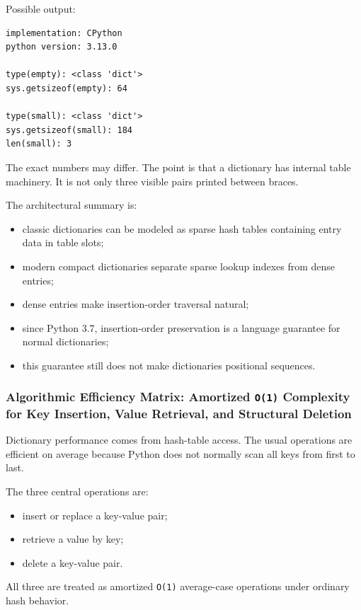 Possible output:

\begin{verbatim}
implementation: CPython
python version: 3.13.0

type(empty): <class 'dict'>
sys.getsizeof(empty): 64

type(small): <class 'dict'>
sys.getsizeof(small): 184
len(small): 3
\end{verbatim}

The exact numbers may differ. The point is that a dictionary has internal table machinery. It is not only three visible pairs printed between braces.

The architectural summary is:

\begin{itemize}
    \item classic dictionaries can be modeled as sparse hash tables containing entry data in table slots;
    \item modern compact dictionaries separate sparse lookup indexes from dense entries;
    \item dense entries make insertion-order traversal natural;
    \item since Python 3.7, insertion-order preservation is a language guarantee for normal dictionaries;
    \item this guarantee still does not make dictionaries positional sequences.
\end{itemize}

\subsubsection{Algorithmic Efficiency Matrix: Amortized \texttt{O(1)} Complexity for Key Insertion, Value Retrieval, and Structural Deletion}

Dictionary performance comes from hash-table access. The usual operations are efficient on average because Python does not normally scan all keys from first to last.

The three central operations are:

\begin{itemize}
    \item insert or replace a key-value pair;
    \item retrieve a value by key;
    \item delete a key-value pair.
\end{itemize}

All three are treated as amortized \texttt{O(1)} average-case operations under ordinary hash behavior.

